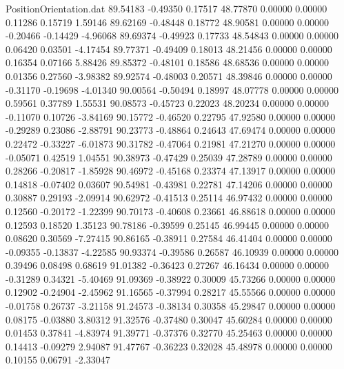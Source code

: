 \begin{filecontents}{PositionOrientation.dat}
  89.54183   -0.49350    0.17517    48.77870    0.00000    0.00000    0.11286    0.15719    1.59146
  89.62169   -0.48448    0.18772    48.90581    0.00000    0.00000   -0.20466   -0.14429   -4.96068
  89.69374   -0.49923    0.17733    48.54843    0.00000    0.00000    0.06420    0.03501   -4.17454
  89.77371   -0.49409    0.18013    48.21456    0.00000    0.00000    0.16354    0.07166    5.88426
  89.85372   -0.48101    0.18586    48.68536    0.00000    0.00000    0.01356    0.27560   -3.98382
  89.92574   -0.48003    0.20571    48.39846    0.00000    0.00000   -0.31170   -0.19698   -4.01340
  90.00564   -0.50494    0.18997    48.07778    0.00000    0.00000    0.59561    0.37789    1.55531
  90.08573   -0.45723    0.22023    48.20234    0.00000    0.00000   -0.11070    0.10726   -3.84169
  90.15772   -0.46520    0.22795    47.92580    0.00000    0.00000   -0.29289    0.23086   -2.88791
  90.23773   -0.48864    0.24643    47.69474    0.00000    0.00000    0.22472   -0.33227   -6.01873
  90.31782   -0.47064    0.21981    47.21270    0.00000    0.00000   -0.05071    0.42519    1.04551
  90.38973   -0.47429    0.25039    47.28789    0.00000    0.00000    0.28266   -0.20817   -1.85928
  90.46972   -0.45168    0.23374    47.13917    0.00000    0.00000    0.14818   -0.07402    0.03607
  90.54981   -0.43981    0.22781    47.14206    0.00000    0.00000    0.30887    0.29193   -2.09914
  90.62972   -0.41513    0.25114    46.97432    0.00000    0.00000    0.12560   -0.20172   -1.22399
  90.70173   -0.40608    0.23661    46.88618    0.00000    0.00000    0.12593    0.18520    1.35123
  90.78186   -0.39599    0.25145    46.99445    0.00000    0.00000    0.08620    0.30569   -7.27415
  90.86165   -0.38911    0.27584    46.41404    0.00000    0.00000   -0.09355   -0.13837   -4.22585
  90.93374   -0.39586    0.26587    46.10939    0.00000    0.00000    0.39496    0.08498    0.68619
  91.01382   -0.36423    0.27267    46.16434    0.00000    0.00000   -0.31289    0.34321   -5.40469
  91.09369   -0.38922    0.30009    45.73266    0.00000    0.00000    0.12902   -0.24904   -2.45962
  91.16565   -0.37994    0.28217    45.55566    0.00000    0.00000   -0.01758    0.26737   -3.21158
  91.24573   -0.38134    0.30358    45.29847    0.00000    0.00000    0.08175   -0.03880    3.80312
  91.32576   -0.37480    0.30047    45.60284    0.00000    0.00000    0.01453    0.37841   -4.83974
  91.39771   -0.37376    0.32770    45.25463    0.00000    0.00000    0.14413   -0.09279    2.94087
  91.47767   -0.36223    0.32028    45.48978    0.00000    0.00000    0.10155    0.06791   -2.33047

\end{filecontents}
